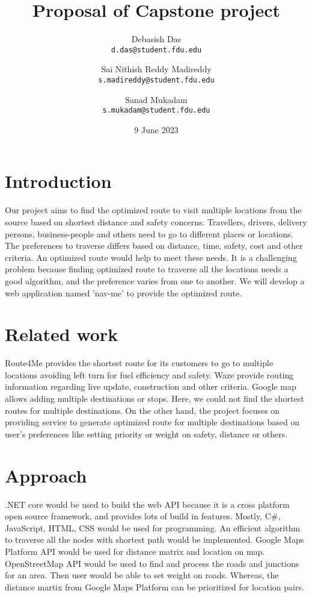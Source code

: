 \documentclass{article}
\title{Proposal of Capstone project}
\author{
  Debasish Das\\
  \texttt{d.das@student.fdu.edu}
  \and
  Sai Nithish Reddy Madireddy\\
  \texttt{s.madireddy@student.fdu.edu}
  \and
  Sanad Mukadam\\
  \texttt{s.mukadam@student.fdu.edu}
}
\date{9 June 2023}
\begin{document}
\maketitle

\section{Introduction}
Our project aims to find the optimized route to visit multiple locations from the source based on shortest distance and safety concerns. Travellers, drivers, delivery persons, business-people and others need to go to different places or locations. The preferences to traverse differs based on distance, time, safety, cost and other criteria. An optimized route would help to meet these needs. It is a challenging problem because finding optimized route to traverse all the locations needs a good algorithm, and the preference varies from one to another. We will develop a web application named 'nav-me' to provide the optimized route.

\section{Related work}
Route4Me provides the shortest route for its customers to go to multiple locations avoiding left turn for fuel efficiency and safety\cite{r1}. Waze provide routing information regarding live update, construction and other criteria\cite{r2}. Google map allows adding multiple destinations or stops\cite{r3}. Here, we could not find the shortest routes for multiple destinations. On the other hand, the project focuses on providing service to generate optimized route for multiple destinations based on user's preferences like setting priority or weight on safety, distance or others. 

\section{Approach}
.NET core would be used to build the web API because it is a cross platform open source framework, and provides lots of build in features. Mostly, C\#, JavaScript, HTML, CSS would be used for programming. An efficient algorithm to traverse all the nodes with shortest path would be implemented. Google Maps Platform API would be used for distance matrix and location on map. OpenStreetMap API would be used to find and process the roads and junctions for an area. Then user would be able to set weight on roads. Whereas, the distance martix from Google Maps Platform can be prioritized for location pairs.
\end{document}
